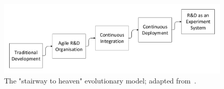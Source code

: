 \begin{figure}[htb]
        \includegraphics[width=\textwidth]{gfx/stairway}
        \caption{The "stairway to heaven" evolutionary model; adapted from~\cite{Olsson2012}.}
        \label{fig:stairway}
\end{figure}




